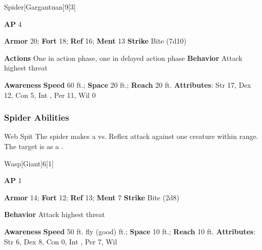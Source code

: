\begin{monsection}{Spider}[Gargantuan]{9}[3]
\vspace{-1em}\vspace{-1em}
\begin{spellcontent}
\begin{spelltargetinginfo}
{\textbf{AP} 4}

\pari \textbf{Armor} 20;
\textbf{Fort} 18;
\textbf{Ref} 16;
\textbf{Ment} 13
\pari \textbf{Strike} Bite  (7d10)


\pari \textbf{Actions} One in action phase, one in delayed action phase
\pari \textbf{Behavior} Attack highest threat
\end{spelltargetinginfo}
\end{spellcontent}

\begin{monsterfooter}
\pari \textbf{Awareness} 
\pari \textbf{Speed} 60 ft.;
\textbf{Space} 20 ft.;
\textbf{Reach} 20 ft.
\pari \textbf{Attributes}:
Str 17,
Dex 12,
Con 5,
Int ,
Per 11,
Wil 0
\end{monsterfooter}
\end{monsection}


\subsubsection{Spider Abilities}

\begin{freeability}{Web Spit}
The spider makes a  vs. Reflex attack against one creature within \rnglong range.
\hit The target is  as a .
\end{freeability}

\begin{monsection}{Wasp}[Giant]{6}[1]
\vspace{-1em}\vspace{-1em}
\begin{spellcontent}
\begin{spelltargetinginfo}
{\textbf{AP} 1}

\pari \textbf{Armor} 14;
\textbf{Fort} 12;
\textbf{Ref} 13;
\textbf{Ment} 7
\pari \textbf{Strike} Bite  (2d8)



\pari \textbf{Behavior} Attack highest threat
\end{spelltargetinginfo}
\end{spellcontent}

\begin{monsterfooter}
\pari \textbf{Awareness} 
\pari \textbf{Speed} 50 ft. fly (good) ft.;
\textbf{Space} 10 ft.;
\textbf{Reach} 10 ft.
\pari \textbf{Attributes}:
Str 6,
Dex 8,
Con 0,
Int ,
Per 7,
Wil 
\end{monsterfooter}
\end{monsection}

